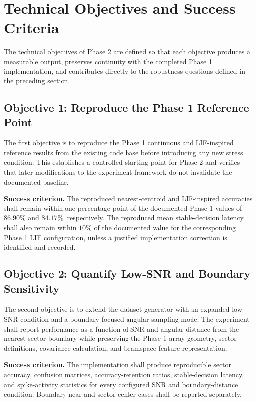 \section{Technical Objectives and Success Criteria}

The technical objectives of Phase 2 are defined so that each objective produces a measurable output, preserves continuity with the completed Phase 1 implementation, and contributes directly to the robustness questions defined in the preceding section.

\subsection{Objective 1: Reproduce the Phase 1 Reference Point}

The first objective is to reproduce the Phase 1 continuous and LIF-inspired reference results from the existing code base before introducing any new stress condition. This establishes a controlled starting point for Phase 2 and verifies that later modifications to the experiment framework do not invalidate the documented baseline.

\textbf{Success criterion.} The reproduced nearest-centroid and LIF-inspired accuracies shall remain within one percentage point of the documented Phase 1 values of $86.90\%$ and $84.17\%$, respectively. The reproduced mean stable-decision latency shall also remain within $10\%$ of the documented value for the corresponding Phase 1 LIF configuration, unless a justified implementation correction is identified and recorded.

\subsection{Objective 2: Quantify Low-SNR and Boundary Sensitivity}

The second objective is to extend the dataset generator with an expanded low-SNR condition and a boundary-focused angular sampling mode. The experiment shall report performance as a function of SNR and angular distance from the nearest sector boundary while preserving the Phase 1 array geometry, sector definitions, covariance calculation, and beamspace feature representation.

\textbf{Success criterion.} The implementation shall produce reproducible sector accuracy, confusion matrices, accuracy-retention ratios, stable-decision latency, and spike-activity statistics for every configured SNR and boundary-distance condition. Boundary-near and sector-center cases shall be reported separately.


